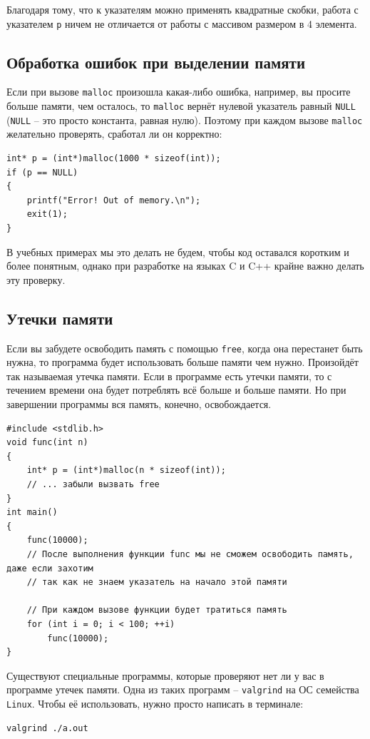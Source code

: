 \documentclass[10pt]{article}
\begin{document}
Благодаря тому, что к указателям можно применять квадратные скобки, работа с указателем \texttt{p} ничем не отличается от работы с массивом размером в 4 элемента.\\


\subsection*{Обработка ошибок при выделении памяти}
Если при вызове \texttt{malloc} произошла какая-либо ошибка, например, вы просите больше памяти, чем осталось, то \texttt{malloc} вернёт нулевой указатель равный \texttt{NULL} (\texttt{NULL} -- это просто константа, равная нулю). Поэтому при каждом вызове \texttt{malloc} желательно проверять, сработал ли он корректно:
\begin{lstlisting}
int* p = (int*)malloc(1000 * sizeof(int));
if (p == NULL) 
{
    printf("Error! Out of memory.\n");
    exit(1);
}
\end{lstlisting}
В учебных примерах мы это делать не будем, чтобы код оставался коротким и более понятным, однако при разработке на языках C и C++ крайне важно делать эту проверку.

\subsection*{Утечки памяти}
Если вы забудете освободить память с помощью \texttt{free}, когда она перестанет быть нужна, то программа будет использовать больше памяти чем нужно. Произойдёт так называемая утечка памяти. Если в программе есть утечки памяти, то с течением времени она будет потреблять всё больше и больше памяти. Но при завершении программы вся память, конечно, освобождается.
\begin{lstlisting}
#include <stdlib.h>
void func(int n) 
{
    int* p = (int*)malloc(n * sizeof(int));
    // ... забыли вызвать free
}
int main() 
{
    func(10000);
    // После выполнения функции func мы не сможем освободить память, даже если захотим
    // так как не знаем указатель на начало этой памяти
    
    // При каждом вызове функции будет тратиться память
    for (int i = 0; i < 100; ++i)
        func(10000);
}
\end{lstlisting}
Существуют специальные программы, которые проверяют нет ли у вас в программе утечек памяти. Одна из таких программ -- \texttt{valgrind} на ОС семейства \texttt{Linux}. Чтобы её использовать, нужно просто написать в терминале:
\begin{verbatim}
valgrind ./a.out
\end{verbatim}
\end{document}
